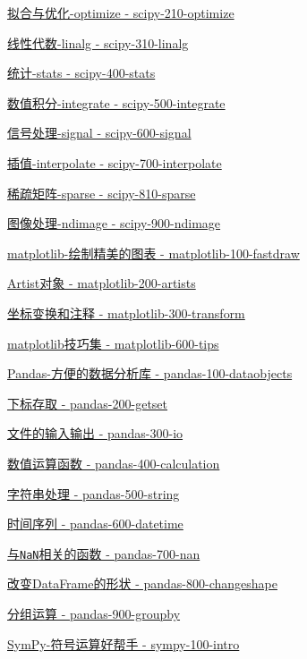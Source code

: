 \documentclass[11pt]{article}
\begin{document}
\href{03-scipy/scipy-210-optimize.ipynb}{拟合与优化-optimize -
scipy-210-optimize}

\href{03-scipy/scipy-310-linalg.ipynb}{线性代数-linalg -
scipy-310-linalg}

\href{03-scipy/scipy-400-stats.ipynb}{统计-stats - scipy-400-stats}

\href{03-scipy/scipy-500-integrate.ipynb}{数值积分-integrate -
scipy-500-integrate}

\href{03-scipy/scipy-600-signal.ipynb}{信号处理-signal -
scipy-600-signal}

\href{03-scipy/scipy-700-interpolate.ipynb}{插值-interpolate -
scipy-700-interpolate}

\href{03-scipy/scipy-810-sparse.ipynb}{稀疏矩阵-sparse -
scipy-810-sparse}

\href{03-scipy/scipy-900-ndimage.ipynb}{图像处理-ndimage -
scipy-900-ndimage}

\href{04-matplotlib/matplotlib-100-fastdraw.ipynb}{matplotlib-绘制精美的图表
- matplotlib-100-fastdraw}

\href{04-matplotlib/matplotlib-200-artists.ipynb}{Artist对象 -
matplotlib-200-artists}

\href{04-matplotlib/matplotlib-300-transform.ipynb}{坐标变换和注释 -
matplotlib-300-transform}

\href{04-matplotlib/matplotlib-600-tips.ipynb}{matplotlib技巧集 -
matplotlib-600-tips}

\href{05-pandas/pandas-100-dataobjects.ipynb}{Pandas-方便的数据分析库 -
pandas-100-dataobjects}

\href{05-pandas/pandas-200-getset.ipynb}{下标存取 - pandas-200-getset}

\href{05-pandas/pandas-300-io.ipynb}{文件的输入输出 - pandas-300-io}

\href{05-pandas/pandas-400-calculation.ipynb}{数值运算函数 -
pandas-400-calculation}

\href{05-pandas/pandas-500-string.ipynb}{字符串处理 - pandas-500-string}

\href{05-pandas/pandas-600-datetime.ipynb}{时间序列 -
pandas-600-datetime}

\href{05-pandas/pandas-700-nan.ipynb}{与\texttt{NaN}相关的函数 -
pandas-700-nan}

\href{05-pandas/pandas-800-changeshape.ipynb}{改变DataFrame的形状 -
pandas-800-changeshape}

\href{05-pandas/pandas-900-groupby.ipynb}{分组运算 - pandas-900-groupby}

\href{06-sympy/sympy-100-intro.ipynb}{SymPy-符号运算好帮手 -
sympy-100-intro}
\end{document}
